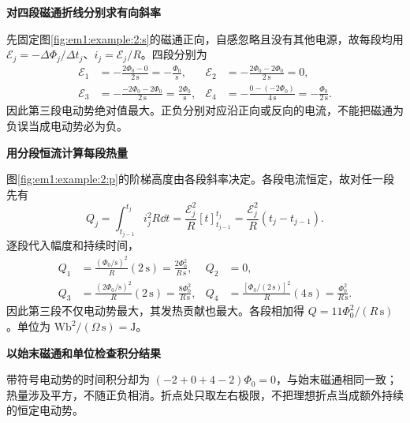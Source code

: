 \begin{solution}\textbf{对四段磁通折线分别求有向斜率}\par\nobreak
先固定图\ref{fig:em1:example:2:s}的磁通正向，自感忽略且没有其他电源，故每段均用 $\mathcal E_j=-\Delta\Phi_j/\Delta t_j$、$i_j=\mathcal E_j/R$。四段分别为
\begin{align*}
\mathcal E_1&=-\frac{2\Phi_0-0}{2\,\mathrm s}=-\frac{\Phi_0}{\mathrm s},&\mathcal E_2&=-\frac{2\Phi_0-2\Phi_0}{2\,\mathrm s}=0,\\
\mathcal E_3&=-\frac{-2\Phi_0-2\Phi_0}{2\,\mathrm s}=\frac{2\Phi_0}{\mathrm s},&\mathcal E_4&=-\frac{0-(-2\Phi_0)}{4\,\mathrm s}=-\frac{\Phi_0}{2\,\mathrm s}.
\end{align*}
因此第三段电动势绝对值最大。正负分别对应沿正向或反向的电流，不能把磁通为负误当成电动势必为负。



\par\medskip{}\noindent\textbf{用分段恒流计算每段热量}\par\nobreak
图\ref{fig:em1:example:2:p}的阶梯高度由各段斜率决定。各段电流恒定，故对任一段先有
\[
 Q_j=\int_{t_{j-1}}^{t_j}i_j^2R\dd t
 =\frac{\mathcal E_j^2}{R}[t]_{t_{j-1}}^{t_j}
 =\frac{\mathcal E_j^2}{R}(t_j-t_{j-1}).
\]
逐段代入幅度和持续时间，
\[
 \begin{aligned}
 Q_1&=\frac{(\Phi_0/\mathrm s)^2}{R}(2\,\mathrm s)
 =\frac{2\Phi_0^2}{R\,\mathrm s},& Q_2&=0,\\
 Q_3&=\frac{(2\Phi_0/\mathrm s)^2}{R}(2\,\mathrm s)
 =\frac{8\Phi_0^2}{R\,\mathrm s},&
 Q_4&=\frac{[\Phi_0/(2\,\mathrm s)]^2}{R}(4\,\mathrm s)
 =\frac{\Phi_0^2}{R\,\mathrm s}.
 \end{aligned}
\]
因此第三段不仅电动势最大，其发热贡献也最大。各段相加得 $Q=11\Phi_0^2/(R\,\mathrm s)$。单位为 $\mathrm{Wb}^2/(\Omega\,\mathrm s)=\mathrm J$。



\par\medskip{}\noindent\textbf{以始末磁通和单位检查积分结果}\par\nobreak
带符号电动势的时间积分却为 $(-2+0+4-2)\Phi_0=0$，与始末磁通相同一致；热量涉及平方，不随正负相消。折点处只取左右极限，不把理想折点当成额外持续的恒定电动势。\end{solution}
